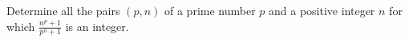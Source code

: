 Determine all the pairs $ (p , n )$ of a prime number $ p$ and a positive integer $ n$ for which $ \frac{ n^p + 1 }{p^n + 1} $ is an integer.